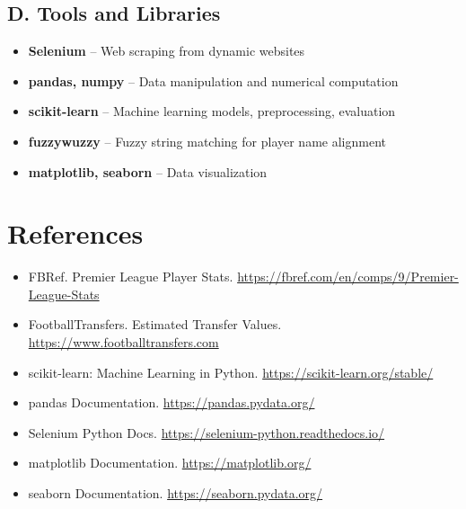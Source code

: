 \documentclass[12pt,a4paper]{article}
\begin{document}
\subsection*{D. Tools and Libraries}
\begin{itemize}
    \item \textbf{Selenium} – Web scraping from dynamic websites
    \item \textbf{pandas, numpy} – Data manipulation and numerical computation
    \item \textbf{scikit-learn} – Machine learning models, preprocessing, evaluation
    \item \textbf{fuzzywuzzy} – Fuzzy string matching for player name alignment
    \item \textbf{matplotlib, seaborn} – Data visualization
\end{itemize}

\newpage
\section*{References}

\begin{itemize}
    \item FBRef. Premier League Player Stats. \url{https://fbref.com/en/comps/9/Premier-League-Stats}
    \item FootballTransfers. Estimated Transfer Values. \url{https://www.footballtransfers.com}
    \item scikit-learn: Machine Learning in Python. \url{https://scikit-learn.org/stable/}
    \item pandas Documentation. \url{https://pandas.pydata.org/}
    \item Selenium Python Docs. \url{https://selenium-python.readthedocs.io/}
    \item matplotlib Documentation. \url{https://matplotlib.org/}
    \item seaborn Documentation. \url{https://seaborn.pydata.org/}
\end{itemize}
\end{document}
